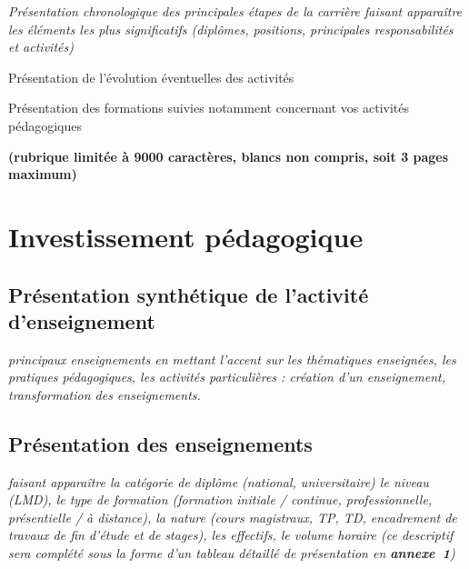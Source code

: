 \documentclass[a4paper,12pt]{article}
\newcommand{\ligneSeparatrice}{\noindent{\color{black!40}\rule{\textwidth}{2pt}}}
\newcommand{\instructions}[1]{{\color{black}#1}}
\begin{document}
\instructions{%
	{\em
	Présentation chronologique des principales étapes de la carrière faisant apparaître les éléments les plus significatifs (diplômes, positions, principales responsabilités et activités)

	\medskip

	Présentation de l'évolution éventuelles des activités

	\medskip

	Présentation des formations suivies notamment concernant vos activités pédagogiques
	}

	\medskip

	\textbf{(rubrique limitée à 9000 caractères, blancs non compris, soit 3 pages maximum)}
}


\ligneSeparatrice{}


\section{Investissement pédagogique}

\subsection{Présentation synthétique de l'activité d'enseignement}

\instructions{%
	{\em
	principaux enseignements en mettant l'accent sur les thématiques enseignées, les pratiques pédagogiques, les activités particulières : création d'un enseignement, transformation des enseignements.
	}
}



\subsection{Présentation des enseignements}

\instructions{%
	{\em
	faisant apparaître la catégorie de diplôme (national, universitaire) le niveau (LMD), le type de formation (formation initiale / continue, professionnelle, présentielle / à distance), la nature (cours magistraux, TP, TD, encadrement de travaux de fin d'étude et de stages), les effectifs, le volume horaire (ce descriptif sera complété sous la forme d'un tableau détaillé de présentation en \textbf{annexe~1})
	}
}
\end{document}
